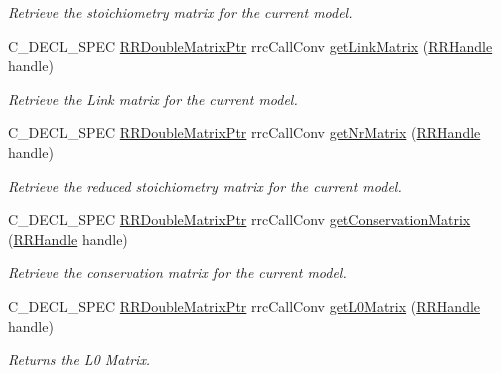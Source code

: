 \begin{DoxyCompactItemize}
\begin{DoxyCompactList}\small\item\em Retrieve the stoichiometry matrix for the current model. \end{DoxyCompactList}\item 
C\+\_\+\+D\+E\+C\+L\+\_\+\+S\+P\+E\+C \hyperlink{rrc__types_8h_ae586a879d30f0823087e42d93464b5dd}{R\+R\+Double\+Matrix\+Ptr} rrc\+Call\+Conv \hyperlink{group___stoich_gad42abf401bcd8f7bbe9255d6013b512b}{get\+Link\+Matrix} (\hyperlink{rrc__types_8h_a1d68f0592372208fa5a5f2799ea4b3ae}{R\+R\+Handle} handle)
\begin{DoxyCompactList}\small\item\em Retrieve the Link matrix for the current model. \end{DoxyCompactList}\item 
C\+\_\+\+D\+E\+C\+L\+\_\+\+S\+P\+E\+C \hyperlink{rrc__types_8h_ae586a879d30f0823087e42d93464b5dd}{R\+R\+Double\+Matrix\+Ptr} rrc\+Call\+Conv \hyperlink{group___stoich_ga6f7995e073044c3e1767c9eda148e0c8}{get\+Nr\+Matrix} (\hyperlink{rrc__types_8h_a1d68f0592372208fa5a5f2799ea4b3ae}{R\+R\+Handle} handle)
\begin{DoxyCompactList}\small\item\em Retrieve the reduced stoichiometry matrix for the current model. \end{DoxyCompactList}\item 
C\+\_\+\+D\+E\+C\+L\+\_\+\+S\+P\+E\+C \hyperlink{rrc__types_8h_ae586a879d30f0823087e42d93464b5dd}{R\+R\+Double\+Matrix\+Ptr} rrc\+Call\+Conv \hyperlink{group___stoich_gab253411012b1974cf831970034453aef}{get\+Conservation\+Matrix} (\hyperlink{rrc__types_8h_a1d68f0592372208fa5a5f2799ea4b3ae}{R\+R\+Handle} handle)
\begin{DoxyCompactList}\small\item\em Retrieve the conservation matrix for the current model. \end{DoxyCompactList}\item 
C\+\_\+\+D\+E\+C\+L\+\_\+\+S\+P\+E\+C \hyperlink{rrc__types_8h_ae586a879d30f0823087e42d93464b5dd}{R\+R\+Double\+Matrix\+Ptr} rrc\+Call\+Conv \hyperlink{group___stoich_gabcc1c1d88e91e4c17888f63a1158fade}{get\+L0\+Matrix} (\hyperlink{rrc__types_8h_a1d68f0592372208fa5a5f2799ea4b3ae}{R\+R\+Handle} handle)
\begin{DoxyCompactList}\small\item\em Returns the L0 Matrix. \end{DoxyCompactList}\item 

\end{DoxyCompactItemize}
